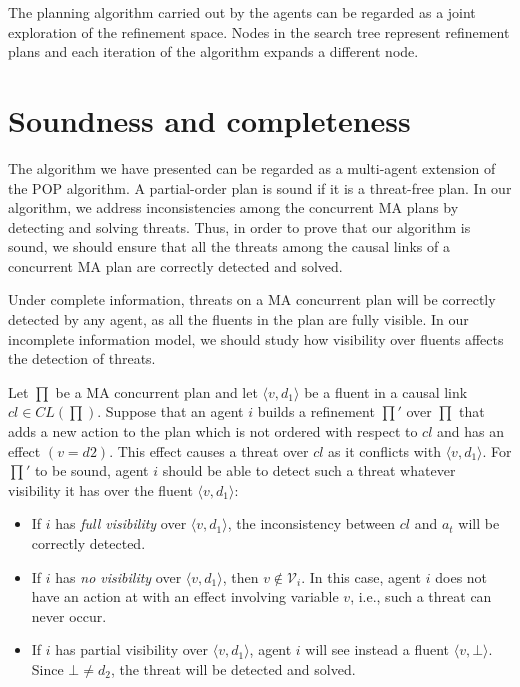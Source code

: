 \documentclass[12pt]{article}
\begin{document}
The planning algorithm carried out by the agents can be regarded as a joint exploration of the refinement space.
Nodes in the search tree represent refinement plans and each iteration of the algorithm expands a different node.

\section{Soundness and completeness}

The algorithm we have presented can be regarded as a multi-agent extension of the POP algorithm.
A partial-order plan is sound if it is a threat-free plan.
In our algorithm, we address inconsistencies among the concurrent MA plans by detecting and solving threats.
Thus, in order to prove that our algorithm is sound, we should ensure that all the threats among the causal links of a concurrent MA plan are correctly detected and solved.

Under complete information, threats on a MA concurrent plan will be correctly detected by any agent, as all the fluents in the plan are fully visible.
In our incomplete information model, we should study how visibility over fluents affects the detection of threats.

Let $\prod$ be a MA concurrent plan and let $\langle v,d_1\rangle$ be a fluent in a causal link $cl \in CL(\prod)$.
Suppose that an agent $i$ builds a refinement $\prod'$ over $\prod$ that adds a new action to the plan which is not ordered with respect to $cl$ and has an effect $(v = d2)$.
This effect causes a threat over $cl$ as it conflicts with $\langle v,d_1\rangle$.
For $\prod'$ to be sound, agent $i$ should be able to detect such a threat whatever visibility it has over the fluent $\langle v,d_1\rangle$:

\begin{itemize}
  \item If $i$ has \textit{full visibility} over $\langle v,d_1\rangle$, the inconsistency between $cl$ and $a_t$ will be correctly detected.
  \item If $i$ has \textit{no visibility} over $\langle v,d_1\rangle$, then $v \notin \mathcal{V}_i$.
In this case, agent $i$ does not have an action at with an effect involving variable $v$, i.e., such a threat can never occur.
  \item If $i$ has partial visibility over $\langle v,d_1\rangle$, agent $i$ will see instead a fluent $\langle v,\bot\rangle$.
Since $\bot\neq d_2$, the threat will be detected and solved.
\end{itemize}
\end{document}
